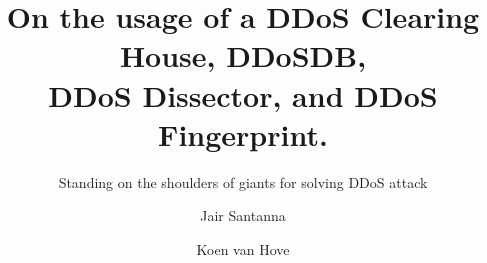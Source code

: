 \documentclass[sigconf,natbib=true]{acmart}
\begin{document}
\title{On the usage of a DDoS Clearing House, DDoSDB,\\DDoS Dissector, and DDoS Fingerprint.}
\subtitle{Standing on the shoulders of giants for solving DDoS attack}
\author{Jair Santanna}

\author{Koen van Hove}





\maketitle






%

\end{document}
